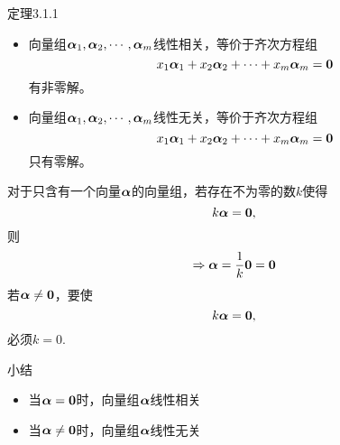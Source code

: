 \begin{frame}
  \begin{footnotesize}
    \begin{block}{定理3.1.1}
      \begin{itemize}
      \item  向量组$\boldsymbol{\alpha}_1,\boldsymbol{\alpha}_2,\cdots,\boldsymbol{\alpha}_m$线性相关，等价于齐次方程组
        $$
        x_1\boldsymbol{\alpha}_1+x_2\boldsymbol{\alpha}_2+\cdots+x_m\boldsymbol{\alpha}_m=\mathbf{0}
        $$
        有非零解。
      \item  向量组$\boldsymbol{\alpha}_1,\boldsymbol{\alpha}_2,\cdots,\boldsymbol{\alpha}_m$线性无关，等价于齐次方程组
        $$
        x_1\boldsymbol{\alpha}_1+x_2\boldsymbol{\alpha}_2+\cdots+x_m\boldsymbol{\alpha}_m=\mathbf{0}
        $$
        只有零解。
      \end{itemize}

    \end{block}
  \end{footnotesize}
\end{frame}


\begin{frame}
  \begin{footnotesize}
    对于只含有一个向量$\boldsymbol{\alpha}$的向量组，若存在不为零的数$k$使得
    $$
    k \boldsymbol{\alpha} = \mathbf{0},
    $$
    则
    $$
    \Rightarrow \boldsymbol{\alpha} = \frac1k \mathbf{0} = \mathbf{0}
    $$ \pause 
    若$\boldsymbol{\alpha}\ne \mathbf{0}$，要使
    $$
    k \boldsymbol{\alpha} = \mathbf{0},
    $$
    必须$k=0$.
    \pause 
    \begin{block}{小结}
      \begin{itemize}
      \item 当$\boldsymbol{\alpha}=\mathbf{0}$时，向量组$\boldsymbol{\alpha}$线性相关
      \item 当$\boldsymbol{\alpha}\ne \mathbf{0}$时，向量组$\boldsymbol{\alpha}$线性无关
      \end{itemize}
    \end{block}
  \end{footnotesize}
\end{frame}


